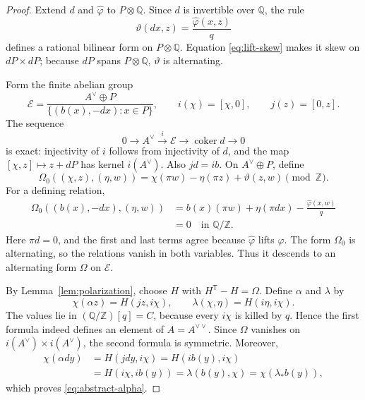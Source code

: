 \documentclass[11pt]{amsart}
\theoremstyle{definition}
\theoremstyle{remark}
\newcommand{\Z}{\mathbb Z}
\newcommand{\Q}{\mathbb Q}
\newcommand{\coker}{\operatorname{coker}}
\begin{document}
\begin{proof}
Extend \(d\) and \(\widehat\varphi\) to \(P\otimes\Q\).  Since \(d\)
is invertible over \(\Q\), the rule
 \begin{equation}\label{eq:vartheta}
                     \vartheta(dx,z)
                        =\frac{\widehat\varphi(x,z)}q
 \end{equation}
defines a rational bilinear form on \(P\otimes\Q\).
Equation \eqref{eq:lift-skew} makes it skew on \(dP\times dP\);
because \(dP\) spans \(P\otimes\Q\), \(\vartheta\) is alternating.

Form the finite abelian group
\[
 \mathcal E=
 \frac{A^\vee\oplus P}{\{(b(x),-dx):x\in P\}},
 \qquad i(\chi)=[\chi,0],\qquad j(z)=[0,z].
\]
The sequence
\[
 0\longrightarrow A^\vee\xrightarrow{i}\mathcal E
   \longrightarrow\coker d\longrightarrow0
\]
is exact: injectivity of \(i\) follows from injectivity of \(d\), and
the map \([\chi,z]\mapsto z+dP\) has kernel \(i(A^\vee)\).
Also \(jd=ib\).  On \(A^\vee\oplus P\), define
\[
 \Omega_0((\chi,z),(\eta,w))
  =\chi(\pi w)-\eta(\pi z)+\vartheta(z,w)\pmod{\Z}.
\]
For a defining relation,
\[
\begin{aligned}
 \Omega_0((b(x),-dx),(\eta,w))
 &=b(x)(\pi w)+\eta(\pi dx)
      -\frac{\widehat\varphi(x,w)}q\\
 &=0\quad\text{in }\Q/\Z.
\end{aligned}
\]
Here \(\pi d=0\), and the first and last terms agree because
\(\widehat\varphi\) lifts \(\varphi\).  The form \(\Omega_0\) is
alternating, so the relations vanish in both variables.  Thus it
descends to an alternating form \(\Omega\) on \(\mathcal E\).

By Lemma~\ref{lem:polarization}, choose \(H\) with
\(H^{\mathsf T}-H=\Omega\).  Define \(\alpha\) and \(\lambda\) by
\begin{equation}\label{eq:alpha-lambda}
 \chi(\alpha z)=H(jz,i\chi),\qquad
 \lambda(\chi,\eta)=H(i\eta,i\chi).
\end{equation}
The values lie in
\((\Q/\Z)[q]=C\), because every \(i\chi\) is killed by \(q\).
Hence the first formula indeed defines an element of
\(A=A^{\vee\vee}\).  Since \(\Omega\) vanishes on
\(i(A^\vee)\times i(A^\vee)\), the second formula is symmetric.
Moreover,
\[
\begin{aligned}
 \chi(\alpha dy)
 &=H(jdy,i\chi)=H(ib(y),i\chi)\\
 &=H(i\chi,ib(y))
  =\lambda(b(y),\chi)
  =\chi(\lambda_*b(y)),
\end{aligned}
\]
which proves \eqref{eq:abstract-alpha}.


\end{proof}
\end{document}
